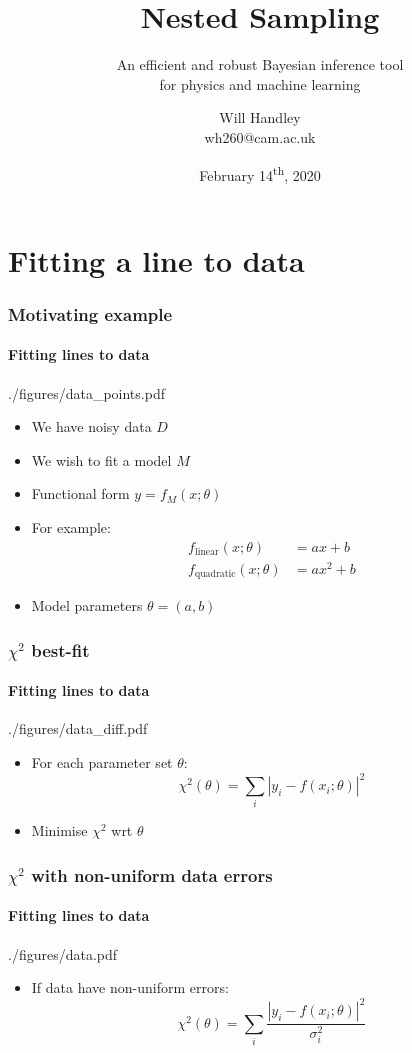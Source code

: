 \documentclass[%
]{beamer}
\title{Nested Sampling}
\subtitle{An efficient and robust Bayesian inference tool\\ for physics and machine learning}
\author[Handley] %
{Will Handley\\ \small{wh260@cam.ac.uk}}
\institute[University of Cambridge] %
{%
Kavli Institute for Cosmology \\
Astrophysics Group \\
Cavendish Laboratory \\
University of Cambridge
}
\date{February 14\textsuperscript{th}, 2020}
\begin{document}
\begin{frame}
  \titlepage
\end{frame}

\section{Fitting a line to data}
\begin{frame}
    \frametitle{Motivating example}
    \framesubtitle{Fitting lines to data}
    \begin{figright}[0.4]{./figures/data_points.pdf}
        \begin{itemize}
            \item We have noisy data $D$
            \item We wish to fit a model $M$
            \item Functional form $y=f_M(x;\theta)$
            \item For example:
                \begin{align}
                     f_\text{linear}(x;\theta)&=a x + b       \nonumber\\
                     f_\text{quadratic}(x;\theta)&=a x^2 + b  \nonumber
                \end{align}
            \item Model parameters $\theta= (a,b)$
        \end{itemize}
    \end{figright}
\end{frame}

\begin{frame}
    \frametitle{$\chi^2$ best-fit}
    \framesubtitle{Fitting lines to data}
    \begin{figright}[0.4]{./figures/data_diff.pdf}
        \begin{itemize}
            \item For each parameter set $\theta$:
                \[
                    \chi^2(\theta) = \sum_i \left|y_i - f(x_i;\theta)\right|^2
                \]
            \item Minimise $\chi^2$ wrt $\theta$
        \end{itemize}
    \end{figright}
\end{frame}

\begin{frame}
    \frametitle{$\chi^2$ with non-uniform data errors}
    \framesubtitle{Fitting lines to data}
    \begin{figright}[0.4]{./figures/data.pdf}
        \begin{itemize}
            \item If data have non-uniform errors:
                \[
                    \chi^2(\theta) = \sum_i \frac{\left|y_i - f(x_i;\theta)\right|^2}{\sigma_i^2}
                \]
        \end{itemize}
    \end{figright}
\end{frame}
\end{document}
